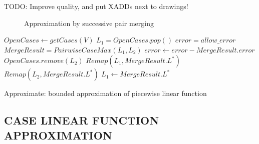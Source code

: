 {\Large TODO: Improve quality, and put XADDs next to drawings!}
\begin{figure}[!ht]
\centering



\caption{ Approximation by successive pair merging}
 \label{fig:steplining}
\end{figure}

\begin{algorithm}[!ht]
\dontprintsemicolon
{}
$OpenCases \gets getCases(V)$\;
 {
	$L_1 = OpenCases.pop()$\;
	$error = allow\_error$\;
	  { 
		$MergeResult = PairwiseCaseMax( L_1, L_2)$\;
		{
			$error \gets error - MergeResult.error$\;
			$OpenCases.remove(L_2)$\;
			$ Remap(L_1, MergeResult.L^*) $\;
			$ Remap(L_2, MergeResult.L^*) $\;
			$ L_1 \gets MergeResult.L^* $\;
		}
	}
}
\;
\caption{{\sc Approximate}: bounded approximation of piecewise linear function}
\label{alg:approx}
\end{algorithm}

\subsection{CASE LINEAR FUNCTION APPROXIMATION}

